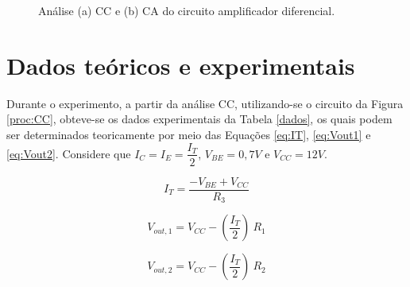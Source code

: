 \documentclass[a4paper,12pt,oneside,openany,table,xcdraw]{article}
\begin{document}
\begin{figure}[H]
\center
{}\hfill
{}
\caption{Análise (a) CC e (b) CA do circuito amplificador diferencial.}
\label{proc:analise}
\end{figure}
\vspace{0.5cm}

\section{Dados teóricos e experimentais}
Durante o experimento, a partir da análise CC, utilizando-se o circuito da Figura \ref{proc:CC}, obteve-se os dados experimentais da Tabela \ref{dados}, os quais podem ser determinados teoricamente por meio das Equações \ref{eq:IT}, \ref{eq:Vout1} e \ref{eq:Vout2}. Considere que $I_{C} =I_{E} =  \dfrac{I_{T}}{2}$, $V_{BE} = 0,7 V$ e $V_{CC}=12 V$.
\vspace{0.2cm}

\begin{equation} \label{eq:IT}
I_{T} = \dfrac{-V_{BE} + V_{CC}}{R_{3}}
\end{equation}

\begin{equation} \label{eq:Vout1}
V_{out,1} = V_{CC} - (\dfrac{I_{T}}{2})\ R_{1}
\end{equation}


\begin{equation} \label{eq:Vout2}
V_{out,2} = V_{CC} - (\dfrac{I_{T}}{2})\ R_{2}
\end{equation}
 
\end{document}
